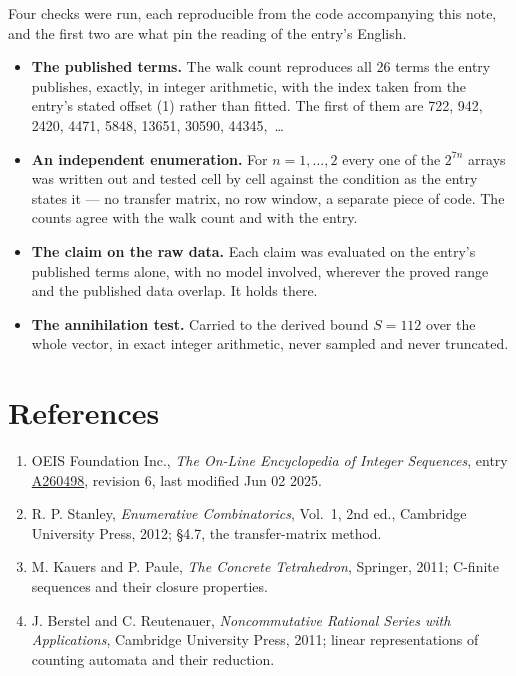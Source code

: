 \documentclass[11pt]{article}
\theoremstyle{definition}
\begin{document}
Four checks were run, each reproducible from the code accompanying this note, and the first two are what pin the reading of the entry's English.

\begin{itemize}

\item {\bfseries The published terms.} The walk count reproduces all 26 terms the entry publishes, exactly, in integer arithmetic, with the index taken from the entry's stated offset (1) rather than fitted. The first of them are 722, 942, 2420, 4471, 5848, 13651, 30590, 44345,~\dots

\item {\bfseries An independent enumeration.} For $n = 1,\dots,2$ every one of the $2^{7n}$ arrays was written out and tested cell by cell against the condition as the entry states it --- no transfer matrix, no row window, a separate piece of code. The counts agree with the walk count and with the entry.

\item {\bfseries The claim on the raw data.} Each claim was evaluated on the entry's published terms alone, with no model involved, wherever the proved range and the published data overlap. It holds there.

\item {\bfseries The annihilation test.} Carried to the derived bound $S = 112$ over the whole vector, in exact integer arithmetic, never sampled and never truncated.

\end{itemize}

\section{References}

\begin{enumerate}

\item OEIS Foundation Inc., \emph{The On-Line Encyclopedia of Integer Sequences}, entry \href{https://oeis.org/A260498}{A260498}, revision 6, last modified Jun 02 2025.

\item R. P. Stanley, \emph{Enumerative Combinatorics}, Vol.~1, 2nd ed., Cambridge University Press, 2012; \S4.7, the transfer-matrix method.

\item M. Kauers and P. Paule, \emph{The Concrete Tetrahedron}, Springer, 2011; C-finite sequences and their closure properties.

\item J. Berstel and C. Reutenauer, \emph{Noncommutative Rational Series with Applications}, Cambridge University Press, 2011; linear representations of counting automata and their reduction.

\end{enumerate}
\end{document}
